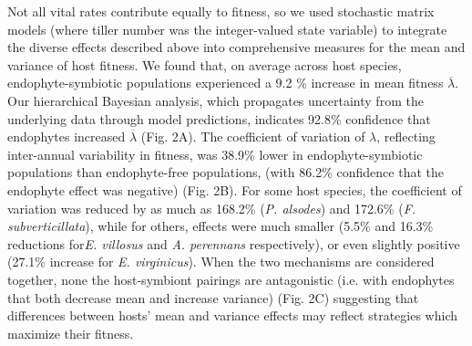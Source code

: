 \documentclass[12pt]{article}
\begin{document}
Not all vital rates contribute equally to fitness, so we used stochastic matrix models (where tiller number was the integer-valued state variable) to integrate the diverse effects described above into comprehensive measures for the mean and variance of host fitness.
We found that, on average across host species, endophyte-symbiotic populations experienced a 9.2 \% increase in mean fitness $\overline{\lambda}$. 
Our hierarchical Bayesian analysis, which propagates uncertainty from the underlying data through model predictions, indicates 92.8\% confidence that endophytes increased $\overline{\lambda}$ (Fig. 2A).
The coefficient of variation of $\lambda$, reflecting inter-annual variability in fitness, was 38.9\% lower in endophyte-symbiotic populations than endophyte-free populations, (with 86.2\% confidence that the endophyte effect was negative) (Fig. 2B).
For some host species, the coefficient of variation was  reduced by as much as 168.2\% (\emph{P. alsodes}) and 172.6\% (\emph{F. subverticillata}), while for others, effects were much smaller (5.5\% and 16.3\% reductions for\emph{E. villosus} and \emph{A. perennans} respectively), or even slightly positive  (27.1\% increase for \emph{E. virginicus}).
When the two mechanisms are considered together, none the host-symbiont pairings are antagonistic (i.e. with endophytes that both decrease mean and increase variance) (Fig. 2C) suggesting that differences between hosts' mean and variance effects may reflect strategies which maximize their fitness. 
\end{document}

